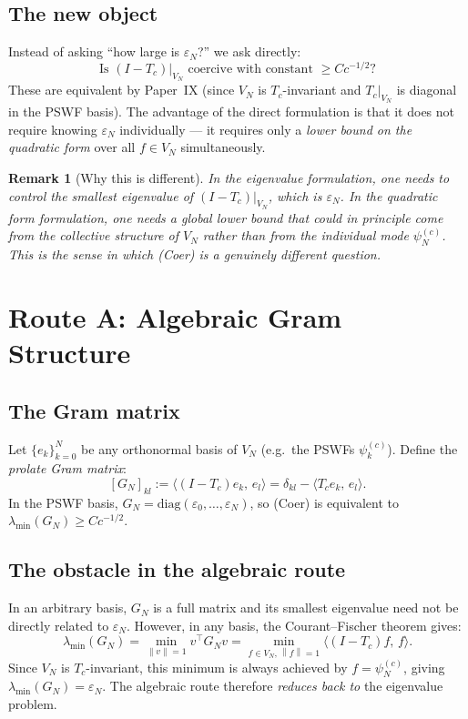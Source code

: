 \documentclass[12pt,a4paper]{article}
\newtheorem{remark}[theorem]{Remark}
\newcommand{\pswf}[1]{\psi_{#1}^{(c)}}
\newcommand{\Tc}{T_c}
\newcommand{\VN}{V_N}
\newcommand{\GN}{G_N}
\newcommand{\inner}[2]{\langle #1,\, #2 \rangle}
\newcommand{\norm}[1]{\left\|#1\right\|}
\begin{document}
\subsection{The new object}

Instead of asking ``how large is $\varepsilon_N$?''
we ask directly:
\[
  \text{Is } (I - \Tc)|_{\VN}
  \text{ coercive with constant } \geq C c^{-1/2}?
\]
These are equivalent by Paper~IX (since $\VN$ is
$\Tc$-invariant and $\Tc|_{\VN}$ is diagonal in
the PSWF basis).
The advantage of the direct formulation is that
it does not require knowing $\varepsilon_N$
individually --- it requires only a
\emph{lower bound on the quadratic form}
over all $f \in \VN$ simultaneously.

\begin{remark}[Why this is different]
In the eigenvalue formulation, one needs to control
the \emph{smallest} eigenvalue of $(I-\Tc)|_{\VN}$,
which is $\varepsilon_N$.
In the quadratic form formulation, one needs a
\emph{global} lower bound that could in principle
come from the collective structure of $\VN$
rather than from the individual mode $\pswf{N}$.
This is the sense in which (Coer) is a genuinely
different question.
\end{remark}

\section{Route A: Algebraic Gram Structure}
\label{sec:gram}

\subsection{The Gram matrix}

Let $\{e_k\}_{k=0}^{N}$ be any orthonormal basis
of $\VN$ (e.g.\ the PSWFs $\pswf{k}$).
Define the \emph{prolate Gram matrix}:
\[
  [\GN]_{kl} := \inner{(I-\Tc)e_k}{e_l}
  = \delta_{kl} - \inner{\Tc e_k}{e_l}.
\]
In the PSWF basis, $\GN = \mathrm{diag}(\varepsilon_0,
\ldots, \varepsilon_N)$, so (Coer) is equivalent to
$\lambda_{\min}(\GN) \geq Cc^{-1/2}$.

\subsection{The obstacle in the algebraic route}

In an arbitrary basis, $\GN$ is a full matrix
and its smallest eigenvalue need not be
directly related to $\varepsilon_N$.
However, in any basis, the Courant--Fischer theorem gives:
\[
  \lambda_{\min}(\GN)
  = \min_{\norm{v}=1} v^\top \GN v
  = \min_{f \in \VN,\, \norm{f}=1}
    \inner{(I-\Tc)f}{f}.
\]
Since $\VN$ is $\Tc$-invariant,
this minimum is always achieved by $f = \pswf{N}$,
giving $\lambda_{\min}(\GN) = \varepsilon_N$.
The algebraic route therefore \emph{reduces back to}
the eigenvalue problem.
\end{document}
